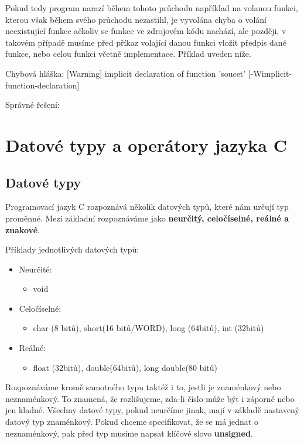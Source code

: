 \documentclass[twoside,a4paper]{article} %
\begin{document}
Pokud tedy program narazí během tohoto průchodu například na volanou funkci, kterou však během svého průchodu nezastihl, je vyvolána chyba o volání neexistující funkce ačkoliv se funkce ve zdrojovém kódu nachází, ale později, v takovém případě musíme před příkaz volající danou funkci vložit předpis dané funkce, nebo celou funkci včetně implementace. Příklad uveden níže.



Chybová hláška: [Warning]  implicit declaration of function 'soucet' [-Wimplicit-function-declaration]

Správné řešení:


\section{Datové typy a operátory jazyka C}
\subsection{Datové typy}
Programovací jazyk C rozpoznává několik datových typů, které nám určují typ proměnné. Mezi základní rozpoznáváme jako \textbf{neurčitý, celočíselné, reálné a znakové}. 

Příklady jednotlivých datových typů:
\begin{itemize}
    \item Neurčité:
    \begin{itemize}
        \item void
    \end{itemize}
    \item Celočíselné:
    \begin{itemize}
        \item char (8 bitů), short(16 bitů/WORD), long (64bitů), int (32bitů)
    \end{itemize}
    \item Reálné:
    \begin{itemize}
        \item float (32bitů), double(64bitů), long double(80 bitů)
    \end{itemize}
\end{itemize}

Rozpoznáváme kromě samotného typu taktéž i to, jestli je znaménkový nebo neznaménkový. To znamená, že rozlišujeme, zda-li číslo může být i záporné nebo jen kladné. Všechny datové typy, pokud neurčíme jinak, mají v základě nastavený datový typ znaménkový. Pokud chceme specifikovat, že se má jednat o neznaménkový, pak před typ musíme napsat klíčové slovo \textbf{unsigned}.
\end{document}
